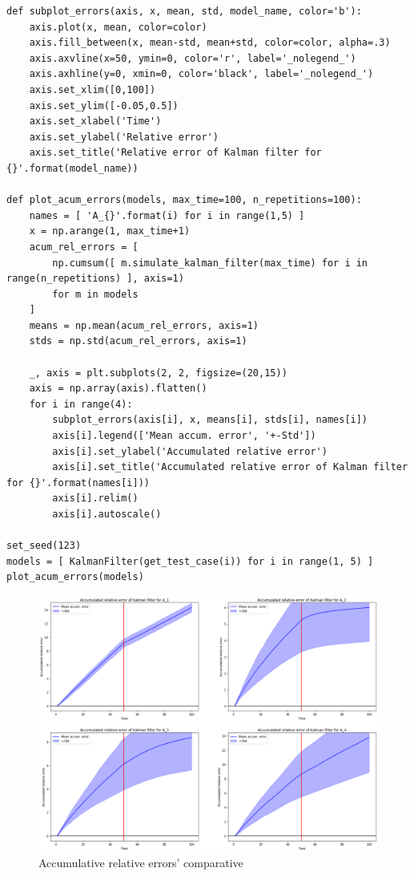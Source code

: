 \documentclass[a4paper]{article}
\begin{document}
\begin{verbatim}
def subplot_errors(axis, x, mean, std, model_name, color='b'):
	axis.plot(x, mean, color=color)
	axis.fill_between(x, mean-std, mean+std, color=color, alpha=.3)
	axis.axvline(x=50, ymin=0, color='r', label='_nolegend_')
	axis.axhline(y=0, xmin=0, color='black', label='_nolegend_')
	axis.set_xlim([0,100])
	axis.set_ylim([-0.05,0.5])
	axis.set_xlabel('Time')
	axis.set_ylabel('Relative error')
	axis.set_title('Relative error of Kalman filter for {}'.format(model_name))
	
def plot_acum_errors(models, max_time=100, n_repetitions=100):
	names = [ 'A_{}'.format(i) for i in range(1,5) ]
	x = np.arange(1, max_time+1)
	acum_rel_errors = [
		np.cumsum([ m.simulate_kalman_filter(max_time) for i in range(n_repetitions) ], axis=1)
		for m in models
	]
	means = np.mean(acum_rel_errors, axis=1)
	stds = np.std(acum_rel_errors, axis=1)
	
	_, axis = plt.subplots(2, 2, figsize=(20,15))  
	axis = np.array(axis).flatten()
	for i in range(4):
		subplot_errors(axis[i], x, means[i], stds[i], names[i])
		axis[i].legend(['Mean accum. error', '+-Std'])
		axis[i].set_ylabel('Accumulated relative error')
		axis[i].set_title('Accumulated relative error of Kalman filter for {}'.format(names[i]))
		axis[i].relim() 
		axis[i].autoscale()
		
set_seed(123) 
models = [ KalmanFilter(get_test_case(i)) for i in range(1, 5) ]
plot_acum_errors(models)
\end{verbatim}

\begin{figure}[H]
	\includegraphics[scale=.45]{figures/kalman_acum}
	\centering
	\caption{Accumulative relative errors' comparative}
\end{figure}
\end{document}
